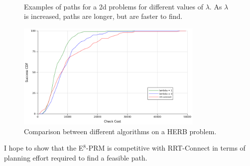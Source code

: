 \begin{figure}
   \centering
   \,
   \caption{Examples of paths for a 2d problems
      for different values of $\lambda$.
      As $\lambda$ is increased,
      paths are longer, but are faster to find.}
   \label{fig:bean}
\end{figure}

\begin{figure}
   \centering
   \includegraphics[width=0.8\textwidth]{figs/timegreedy-herbstep1-comparison-cdfs.png}
   \caption{Comparison between different algorithms on a HERB problem.}
   \label{fig:herb-comparison-cdfs}
\end{figure}

I hope to show that the E$^8$-PRM is competitive with RRT-Connect
in terms of planning effort required to find a feasible path.

